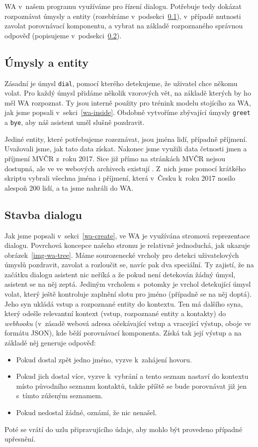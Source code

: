 WA v~našem programu využíváme pro řízení dialogu. Potřebuje tedy dokázat
rozpoznávat úmysly a entity (rozebíráme v~podsekci~\ref{intents-entities}),
v~případě nutnosti zavolat porovnávací komponentu, a vybrat na základě
rozpoznaného správnou odpověď (popisujeme v~podsekci~\ref{building-dialog}).

\subsection{Úmysly a entity}\label{intents-entities}

Zásadní je úmysl
\texttt{dial}, pomocí kterého detekujeme, že uživatel chce někomu volat. Pro
každý úmysl přidáme několik vzorových vět, na základě kterých by ho měl WA
rozpoznat. Ty jsou interně použity pro trénink modelu stojícího za WA, jak
jsme popsali v~sekci~\ref{wa-inside}.
Obdobně vytvoříme zbývající úmysly \texttt{greet} a \texttt{bye}, aby náš
asistent uměl slušně pozdravit.

Jediné entity, které potřebujeme rozeznávat, jsou jména lidí, případně příjmení.
Uvažovali jsme, jak tato
data získat. Nakonec jsme využili data četnosti jmen a příjmení MVČR z~roku 2017.
Sice již přímo na stránkách MVČR nejsou dostupná, ale ve ve webových archivech
existují \citep{mvcr_cetnost_2018}. Z~nich jsme pomocí krátkého skriptu vybrali
všechna jména i příjmení, která v~Česku k~roku 2017 nosilo alespoň
200 lidí, a ta jsme nahráli do WA.

\subsection{Stavba dialogu}\label{building-dialog}

Jak jsme popsali v~sekci~\ref{wa-create}, ve WA je využívána stromová reprezentace dialogu.
Povrchová koncepce našeho stromu je relativně jednoduchá, jak ukazuje obrázek~\ref{img-wa-tree}.
Máme sourozenecké
vrcholy pro detekci uživatelových úmyslů pozdravit, zavolat a rozloučit se, navíc
pak dva speciální. Ty zajistí, že na začátku dialogu asistent nic neříká a že
pokud není detekován žádný úmysl, asistent se na něj zeptá. Jediným vrcholem
s~potomky je vrchol detekující úmysl volat, který ještě kontroluje zaplnění slotu
pro jméno (případně se na něj doptá). Jeho syn ukládá vstup a rozpoznané entity
do kontextu. Ten
má dalšího syna, který odešle relevantní kontext (vstup, rozpoznané entity a kontakty)
do \textit{webhooku} (v~zásadě webová adresa očekávající vstup a vracející
výstup, oboje ve formátu JSON), kde běží porovnávací komponenta. Získá tak její
výstup a na základě něj generuje odpověď:
\begin{itemize}
    \item Pokud dostal zpět jedno jméno, vyzve k~zahájení hovoru.
    \item Pokud jich dostal více, vyzve k~vybrání a tento seznam nastaví do kontextu místo původního
          seznamu kontaktů, takže příště se bude porovnávat již jen s~tímto zúženým seznamem.
    \item Pokud nedostal žádné, oznámí, že nic nenašel.
\end{itemize}
Poté se vrátí do uzlu připravujícího údaje, aby mohlo být provedeno případné
upřesnění.

